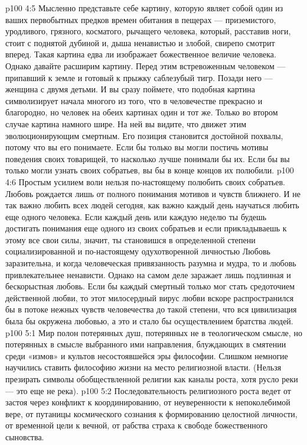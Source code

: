 \vs p100 4:5 Мысленно представьте себе картину, которую являет собой один из ваших первобытных предков времен обитания в пещерах --- приземистого, уродливого, грязного, косматого, рычащего человека, который, расставив ноги, стоит с поднятой дубиной и, дыша ненавистью и злобой, свирепо смотрит вперед. Такая картина едва ли изображает божественное величие человека. Однако давайте расширим картину. Перед этим встревоженным человеком --- припавший к земле и готовый к прыжку саблезубый тигр. Позади него --- женщина с двумя детьми. И вы сразу поймете, что подобная картина символизирует начала многого из того, что в человечестве прекрасно и благородно, но человек на обеих картинах один и тот же. Только во втором случае картина намного шире. На ней вы видите, что движет этим эволюционирующим смертным. Его позиция становится достойной похвалы, потому что вы его понимаете. Если бы только вы могли постичь мотивы поведения своих товарищей, то насколько лучше понимали бы их. Если бы вы только могли узнать своих собратьев, вы бы в конце концов их полюбили.
\vs p100 4:6 Простым усилием воли нельзя по\hyp{}настоящему полюбить своих собратьев. Любовь рождается лишь от полного понимания мотивов и чувств ближнего. И не так важно любить всех людей сегодня, как важно каждый день научаться любить еще одного человека. Если каждый день или каждую неделю ты будешь достигать понимания еще одного из своих собратьев и если прикладываешь к этому все свои силы, значит, ты становишся в определенной степени социализированной и по\hyp{}настоящему одухотворенной личностью Любовь заразительна, и когда человеческая привязанность разумна и мудра, то и любовь привлекательнее ненависти. Однако на самом деле заражает лишь подлинная и бескорыстная любовь. Если бы каждый смертный только мог стать средоточием действенной любви, то этот милосердный вирус любви вскоре распространился бы в потоке нежных чувств человечества до такой степени, что вся цивилизация была бы окружена любовью, а это и стало бы осуществлением братства людей.
\vs p100 5:1 Мир полон потерянных душ, потерянных не в теологическом смысле, но потерянных в смысле выбранного ими направления, блуждающих в смятении среди «измов» и культов несостоявшейся эры философии. Слишком немногие научились ставить философию жизни на место религиозной власти. (Нельзя презирать символы обобществленной религии как каналы роста, хотя русло реки --- это еще не река).
\vs p100 5:2 Последовательность религиозного роста ведет от застоя через конфликт к координированию, от неуверенности к непоколебимой вере, от путаницы космического сознания к формированию целостной личности, от временной цели к вечной, от рабства страха к свободе божественного сыновства.
